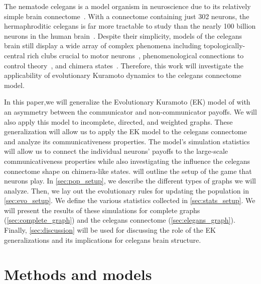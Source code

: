\documentclass[pdflatex,lineno,referee,sn-nature]{sn-jnl}
\begin{document}
The nematode \gls{celegans}
is a model organism in neuroscience due to
its relatively simple brain connectome~\citep{cook2019whole}.
With a connectome containing just \num{302} neurons,
the hermaphroditic \gls{celegans} is far more tractable to study
than the nearly \num{100} billion neurons
in the human brain~\citep[\eg][]{von2016search}.
Despite their simplicity, models of the \gls{celegans} brain
still display a wide array of complex phenomena including
topologically-central rich clubs
crucial to motor neurons~\citep{towlson2013rich},
phenomenological connections to control theory~\citep{yan2017network},
and chimera states~\citep{hizanidis2016chimera}.
Therefore, this work will investigate the applicability
of evolutionary Kuramoto dynamics to the \gls{celegans}
connectome model.

In this paper,we will generalize
the Evolutionary Kuramoto (EK) model
of \tripp{} with an asymmetry between
the communicator and non-communicator payoffs.
We will also apply this model to incomplete, directed, and weighted graphs.
These generalization will allow us to apply the EK model
to the \gls{celegans} connectome
and analyze its communicativeness properties.
The model's simulation statistics
will allow us to connect
the individual neurons' payoffs
to the large-scale communicativeness properties
while also investigating the influence
the \gls{celegans} connectome shape on chimera-like states.
 will outline the setup of the game that neurons play.
In \cref{sec:pop_setup}, we describe the different types
of graphs we will analyze.
Then, we lay out the evolutionary rules for updating the population
in \cref{sec:evo_setup}.
We define the various statistics collected in \cref{sec:stats_setup}.
We will present the results of these simulations for
complete graphs (\cref{sec:complete_graph})
and the \gls{celegans} connectome (\cref{sec:elegans_graph}).
Finally, \cref{sec:discussion} will be used
for discussing the role of the EK generalizations
and its implications for \gls{celegans} brain structure.

\section{Methods and models}
\label{sec:methods}
\end{document}
